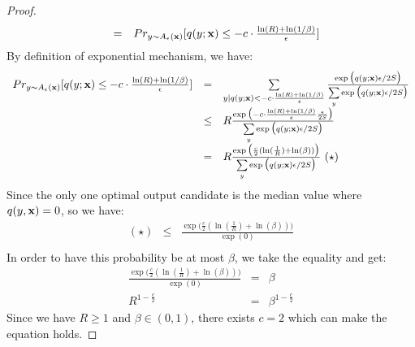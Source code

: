\documentclass[11pt]{article}
\begin{document}
\begin{enumerate}
\begin{proof}
\[\begin{array}{lll}
	& = &
	Pr_{y \sim A_{\epsilon}(\mathbf{x})}[q(y; \mathbf{x})
	\leq 
	- c \cdot \frac{\ln(R) + \ln(1 / \beta)}{\epsilon}]	
	\end{array}
	\]
	By definition of exponential mechanism, we have:
	\[
	\begin{array}{lll}
	Pr_{y \sim A_{\epsilon}(\mathbf{x})}[q(y; \mathbf{x})
	\leq 
	- c \cdot \frac{\ln(R) + \ln(1 / \beta)}{\epsilon}]
	& = &
	\sum\limits_{y| q(y; \mathbf{x}) < - c \cdot \frac{\ln(R) + \ln(1 / \beta)}{\epsilon}}
	\frac{\exp \big( q(y; \mathbf{x})\epsilon / 2S \big)}
	{\sum\limits_{y}\exp \big( q(y; \mathbf{x})\epsilon / 2S \big)}\\
	& \leq &
	R
	\frac{\exp \big( - c \cdot \frac{\ln(R) + \ln(1 / \beta)}{\epsilon}
	\frac{\epsilon}{2S} \big)}
	{\sum\limits_{y}\exp \big( q(y; \mathbf{x})\epsilon / 2S \big)}\\	
	& = &
	R
	\frac{\exp \big(  \frac{c}{2} (\ln(\frac{1}{R}) + \ln(\beta)) \big)}
	{\sum\limits_{y}\exp \big( q(y; \mathbf{x})\epsilon / 2S \big)} ~(\star)
	\end{array}
	\]
	Since the only one optimal output candidate is the median value where $q(y, \mathbf{x}) = 0$, so we have:
	\[
	\begin{array}{lll}
	(\star) & \leq &
	\frac{\exp \big(  \frac{c}{2} (\ln(\frac{1}{R}) + \ln(\beta)) \big)}
	{\exp ( 0)}\\	
	\end{array}
	\]
	In order to have this probability be at most $\beta$, we take the equality and get:
	\[
	\begin{array}{rcl}
	\frac{\exp \big(  \frac{c}{2} (\ln(\frac{1}{R}) + \ln(\beta)) \big)}
	{\exp ( 0)}
	& = & \beta\\
	R^{1 - \frac{c}{2}}	& = & \beta^{1 - \frac{c}{2}}
	\end{array}
	\]
	Since we have $R \geq 1$ and $\beta \in (0,1)$, there exists $c = 2$ which can make the equation holds.
	\end{proof}
\end{enumerate}
\end{document}
